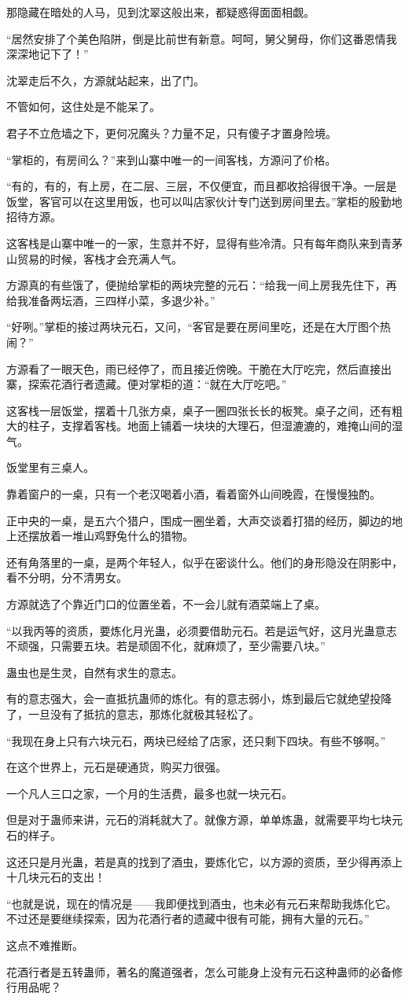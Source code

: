 \begin{this_body}
那隐藏在暗处的人马，见到沈翠这般出来，都疑惑得面面相觑。

“居然安排了个美色陷阱，倒是比前世有新意。呵呵，舅父舅母，你们这番恩情我深深地记下了！”

沈翠走后不久，方源就站起来，出了门。

不管如何，这住处是不能呆了。

君子不立危墙之下，更何况魔头？力量不足，只有傻子才置身险境。

“掌柜的，有房间么？”来到山寨中唯一的一间客栈，方源问了价格。

“有的，有的，有上房，在二层、三层，不仅便宜，而且都收拾得很干净。一层是饭堂，客官可以在这里用饭，也可以叫店家伙计专门送到房间里去。”掌柜的殷勤地招待方源。

这客栈是山寨中唯一的一家，生意并不好，显得有些冷清。只有每年商队来到青茅山贸易的时候，客栈才会充满人气。

方源真的有些饿了，便抛给掌柜的两块完整的元石：“给我一间上房我先住下，再给我准备两坛酒，三四样小菜，多退少补。”

“好咧。”掌柜的接过两块元石，又问，“客官是要在房间里吃，还是在大厅图个热闹？”

方源看了一眼天色，雨已经停了，而且接近傍晚。干脆在大厅吃完，然后直接出寨，探索花酒行者遗藏。便对掌柜的道：“就在大厅吃吧。”

这客栈一层饭堂，摆着十几张方桌，桌子一圈四张长长的板凳。桌子之间，还有粗大的柱子，支撑着客栈。地面上铺着一块块的大理石，但湿漉漉的，难掩山间的湿气。

饭堂里有三桌人。

靠着窗户的一桌，只有一个老汉喝着小酒，看着窗外山间晚霞，在慢慢独酌。

正中央的一桌，是五六个猎户，围成一圈坐着，大声交谈着打猎的经历，脚边的地上还摆放着一堆山鸡野兔什么的猎物。

还有角落里的一桌，是两个年轻人，似乎在密谈什么。他们的身形隐没在阴影中，看不分明，分不清男女。

方源就选了个靠近门口的位置坐着，不一会儿就有酒菜端上了桌。

“以我丙等的资质，要炼化月光蛊，必须要借助元石。若是运气好，这月光蛊意志不顽强，只需要五块。若是顽固不化，就麻烦了，至少需要八块。”

蛊虫也是生灵，自然有求生的意志。

有的意志强大，会一直抵抗蛊师的炼化。有的意志弱小，炼到最后它就绝望投降了，一旦没有了抵抗的意志，那炼化就极其轻松了。

“我现在身上只有六块元石，两块已经给了店家，还只剩下四块。有些不够啊。”

在这个世界上，元石是硬通货，购买力很强。

一个凡人三口之家，一个月的生活费，最多也就一块元石。

但是对于蛊师来讲，元石的消耗就大了。就像方源，单单炼蛊，就需要平均七块元石的样子。

这还只是月光蛊，若是真的找到了酒虫，要炼化它，以方源的资质，至少得再添上十几块元石的支出！

“也就是说，现在的情况是——我即便找到酒虫，也未必有元石来帮助我炼化它。不过还是要继续探索，因为花酒行者的遗藏中很有可能，拥有大量的元石。”

这点不难推断。

花酒行者是五转蛊师，著名的魔道强者，怎么可能身上没有元石这种蛊师的必备修行用品呢？

\end{this_body}

